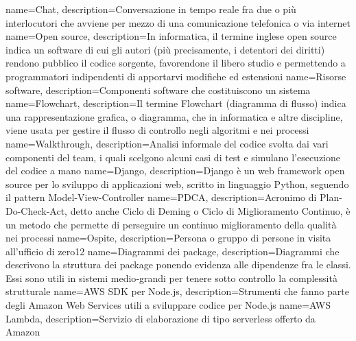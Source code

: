  {
	name=Chat,
	description={Conversazione in tempo reale fra due o più interlocutori che avviene per mezzo di una comunicazione telefonica o via internet}
}
 {
	name=Open source,
	description={In informatica, il termine inglese open source indica un software di cui gli autori (più precisamente, i detentori dei diritti) rendono pubblico il codice sorgente, favorendone il libero studio e permettendo a programmatori indipendenti di apportarvi modifiche ed estensioni}
}
 {
	name=Risorse software,
	description={Componenti software che costituiscono un sistema}
}
 {
	name=Flowchart,
	description={Il termine Flowchart (diagramma di flusso) indica una rappresentazione grafica, o diagramma, che in informatica e altre discipline, viene usata per gestire il flusso di controllo negli algoritmi e nei processi}
}
 {
	name=Walkthrough,
	description={Analisi informale del codice svolta dai vari componenti del team, i quali scelgono alcuni casi di test e simulano l'esecuzione del codice a mano}
}
 {
	name=Django,
	description={Django è un web framework open source per lo sviluppo di applicazioni web, scritto in linguaggio Python, seguendo il pattern Model-View-Controller}
}
 {
	name=PDCA,
	description={Acronimo di Plan-Do-Check-Act, detto anche Ciclo di Deming o Ciclo di Miglioramento Continuo, è un metodo che permette di perseguire un continuo miglioramento della qualità nei processi}
}
 {
	name=Ospite,
	description={Persona o gruppo di persone in visita all'ufficio di zero12}
}
 {
	name=Diagrammi dei package,
	description={Diagrammi che descrivono la struttura dei package ponendo evidenza alle dipendenze fra le classi. Essi sono utili in sistemi medio‐grandi per tenere sotto controllo la complessità strutturale}
}
 {
	name=AWS SDK per Node.js,
	description={Strumenti che fanno parte degli Amazon Web Services utili a sviluppare codice per Node.js}
}
 {
	name=AWS Lambda,
	description={Servizio di elaborazione di tipo serverless offerto da Amazon}
}
